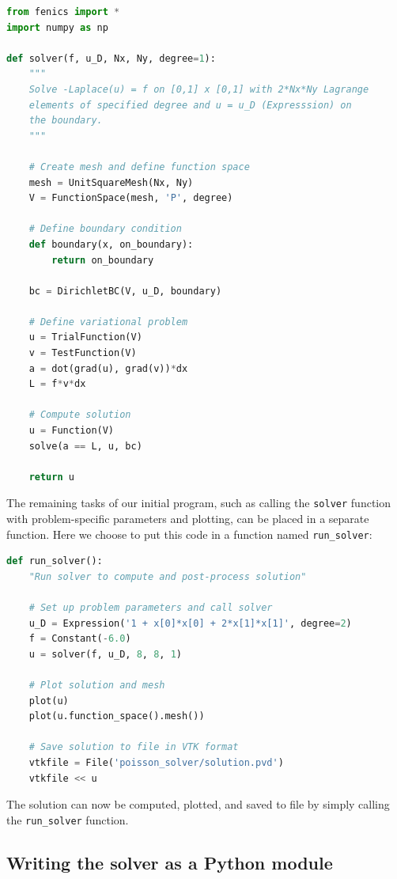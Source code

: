 \documentclass[graybox,envcountchap,sectrefs,final]{svmonodo}
\begin{document}
\begin{lstlisting}[language=Python,style=graycolor]
from fenics import *
import numpy as np

def solver(f, u_D, Nx, Ny, degree=1):
    """
    Solve -Laplace(u) = f on [0,1] x [0,1] with 2*Nx*Ny Lagrange
    elements of specified degree and u = u_D (Expresssion) on
    the boundary.
    """

    # Create mesh and define function space
    mesh = UnitSquareMesh(Nx, Ny)
    V = FunctionSpace(mesh, 'P', degree)

    # Define boundary condition
    def boundary(x, on_boundary):
        return on_boundary

    bc = DirichletBC(V, u_D, boundary)

    # Define variational problem
    u = TrialFunction(V)
    v = TestFunction(V)
    a = dot(grad(u), grad(v))*dx
    L = f*v*dx

    # Compute solution
    u = Function(V)
    solve(a == L, u, bc)

    return u
\end{lstlisting}

The remaining tasks of our initial program, such as calling the \texttt{solver}
function with problem-specific parameters and plotting,
can be placed in a separate function. Here we choose to put this code
in a function named \Verb!run_solver!:

\begin{lstlisting}[language=Python,style=graycolor]
def run_solver():
    "Run solver to compute and post-process solution"

    # Set up problem parameters and call solver
    u_D = Expression('1 + x[0]*x[0] + 2*x[1]*x[1]', degree=2)
    f = Constant(-6.0)
    u = solver(f, u_D, 8, 8, 1)

    # Plot solution and mesh
    plot(u)
    plot(u.function_space().mesh())

    # Save solution to file in VTK format
    vtkfile = File('poisson_solver/solution.pvd')
    vtkfile << u
\end{lstlisting}

The solution can now be computed, plotted, and saved to file by
simply calling the \Verb!run_solver! function.

\subsection{Writing the solver as a Python module}
\end{document}
